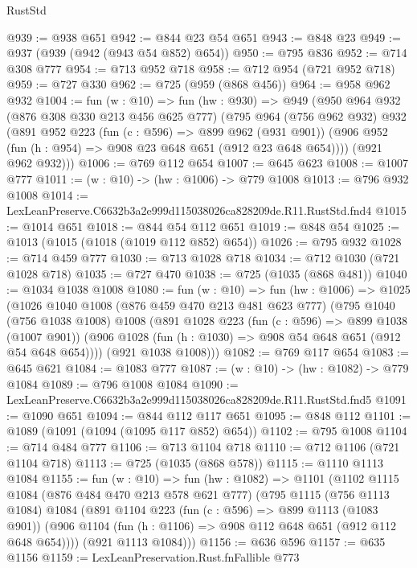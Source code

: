 \begin{lexlean}{RustStd}
\begin{coremodule}
@939 := @938 @651
@942 := @844 @23 @54 @651
@943 := @848 @23
@949 := @937 (@939 (@942 (@943 @54 @852) @654))
@950 := @795 @836
@952 := @714 @308 @777
@954 := @713 @952 @718
@958 := @712 @954 (@721 @952 @718)
@959 := @727 @330
@962 := @725 (@959 (@868 @456))
@964 := @958 @962 @932
@1004 := fun (w : @10) =>
  fun (hw : @930) =>
  @949
    (@950
      @964
      @932
      (@876 @308 @330 @213 @456 @625 @777)
      (@795
        @964
        (@756 @962 @932)
        @932
        (@891
          @952
          @223
          (fun (c : @596) => @899 @962 (@931 @901))
          (@906 @952 (fun (h : @954) => @908 @23 @648 @651 (@912 @23 @648 @654))))
        (@921 @962 @932)))
@1006 := @769 @112 @654
@1007 := @645 @623
@1008 := @1007 @777
@1011 := (w : @10) -> (hw : @1006) -> @779 @1008
@1013 := @796 @932 @1008
@1014 := LexLeanPreserve.C6632b3a2e999d115038026ca828209de.R11.RustStd.fnd4
@1015 := @1014 @651
@1018 := @844 @54 @112 @651
@1019 := @848 @54
@1025 := @1013 (@1015 (@1018 (@1019 @112 @852) @654))
@1026 := @795 @932
@1028 := @714 @459 @777
@1030 := @713 @1028 @718
@1034 := @712 @1030 (@721 @1028 @718)
@1035 := @727 @470
@1038 := @725 (@1035 (@868 @481))
@1040 := @1034 @1038 @1008
@1080 := fun (w : @10) =>
  fun (hw : @1006) =>
  @1025
    (@1026
      @1040
      @1008
      (@876 @459 @470 @213 @481 @623 @777)
      (@795
        @1040
        (@756 @1038 @1008)
        @1008
        (@891
          @1028
          @223
          (fun (c : @596) => @899 @1038 (@1007 @901))
          (@906 @1028 (fun (h : @1030) => @908 @54 @648 @651 (@912 @54 @648 @654))))
        (@921 @1038 @1008)))
@1082 := @769 @117 @654
@1083 := @645 @621
@1084 := @1083 @777
@1087 := (w : @10) -> (hw : @1082) -> @779 @1084
@1089 := @796 @1008 @1084
@1090 := LexLeanPreserve.C6632b3a2e999d115038026ca828209de.R11.RustStd.fnd5
@1091 := @1090 @651
@1094 := @844 @112 @117 @651
@1095 := @848 @112
@1101 := @1089 (@1091 (@1094 (@1095 @117 @852) @654))
@1102 := @795 @1008
@1104 := @714 @484 @777
@1106 := @713 @1104 @718
@1110 := @712 @1106 (@721 @1104 @718)
@1113 := @725 (@1035 (@868 @578))
@1115 := @1110 @1113 @1084
@1155 := fun (w : @10) =>
  fun (hw : @1082) =>
  @1101
    (@1102
      @1115
      @1084
      (@876 @484 @470 @213 @578 @621 @777)
      (@795
        @1115
        (@756 @1113 @1084)
        @1084
        (@891
          @1104
          @223
          (fun (c : @596) => @899 @1113 (@1083 @901))
          (@906 @1104 (fun (h : @1106) => @908 @112 @648 @651 (@912 @112 @648 @654))))
        (@921 @1113 @1084)))
@1156 := @636 @596
@1157 := @635 @1156
@1159 := LexLeanPreservation.Rust.fnFallible @773

\end{coremodule}
\end{lexlean}
